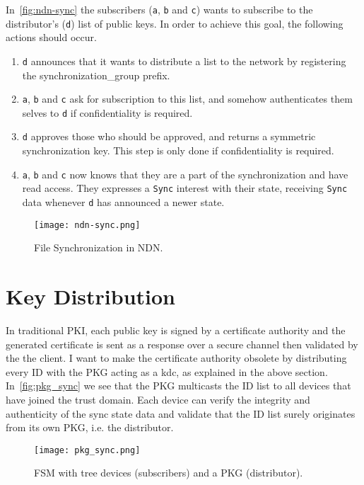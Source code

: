 In~\autoref{fig:ndn-sync} the subscribers (\texttt{a}, \texttt{b} and \texttt{c}) wants to subscribe to the distributor's (\texttt{d}) list of public keys.
In order to achieve this goal, the following actions should occur.
\begin{enumerate}
	\item \texttt{d} announces that it wants to distribute a list to the network by registering the \gls{synchronization_group} prefix. 
	\item \texttt{a}, \texttt{b} and \texttt{c} ask for subscription to this list, and somehow authenticates them selves to \texttt{d} if confidentiality is required.
	\item \texttt{d} approves those who should be approved, and returns a symmetric synchronization key. 
	This step is only done if confidentiality is required.
	\item \texttt{a}, \texttt{b} and \texttt{c} now knows that they are a part of the synchronization and have read access. They expresses a \texttt{Sync} \gls{interest} with their state, receiving \texttt{Sync} \gls{data} whenever \texttt{d} has announced a newer state.
\end{enumerate}

\begin{figure}[ht]
  \centering
  \texttt{[image: ndn-sync.png]}
  \caption[File Synchronization in NDN]{File Synchronization in NDN.}
  \label{fig:ndn-sync}
\end{figure}

\section{Key Distribution}\label{key-distribution}
In traditional \gls{PKI}, each public key is signed by a certificate authority and the generated certificate is sent as a response over a secure channel then validated by the the client.
I want to make the certificate authority obsolete by distributing every \gls{ID} with the \gls{PKG} acting as a \gls{kdc}, as explained in the above section.
In~\autoref{fig:pkg_sync} we see that the \gls{PKG} multicasts the \gls{ID} list to all devices that have joined the trust domain.
Each device can verify the integrity and authenticity of the sync state \gls{data} and validate that the \gls{ID} list surely originates from its own \gls{PKG}, i.e. the distributor.
\begin{figure}[ht]
  \centering
  \texttt{[image: pkg\_sync.png]}
  \caption[File Synchronization Module]{FSM with tree devices (subscribers) and a PKG (distributor).}
  \label{fig:pkg_sync}
\end{figure}


